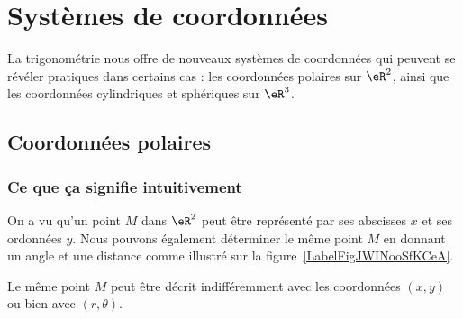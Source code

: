 
\section{Systèmes de coordonnées}
\label{SECooWTPRooZbOSzO}

La trigonométrie nous offre de nouveaux systèmes de coordonnées qui peuvent se révéler pratiques dans certains cas : les coordonnées polaires sur \( \eR^2\), ainsi que les coordonnées cylindriques et sphériques sur \( \eR^3\).

\subsection{Coordonnées polaires}

\subsubsection{Ce que ça signifie intuitivement}

On a vu qu'un point \( M\) dans \( \eR^2\) peut être représenté par ses abscisses \( x\) et ses ordonnées \( y\). Nous pouvons également déterminer le même point \( M\) en donnant un angle et une distance comme illustré sur la figure~\ref{LabelFigJWINooSfKCeA}.
\newcommand{\CaptionFigJWINooSfKCeA}{Un point en coordonnées polaires est donné par sa distance à l'origine et par l'angle qu'il fait avec l'horizontale.}



Le même point \( M\) peut être décrit indifféremment avec les coordonnées \( (x,y)\) ou bien avec \( (r,\theta)\).

